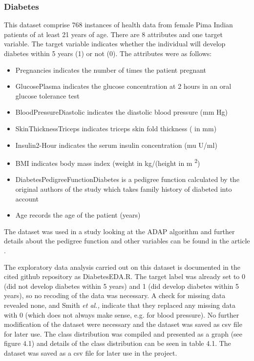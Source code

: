 \subsubsection{Diabetes}
This dataset comprise 768 instances of health data from female Pima Indian patients of at least 21 years of age. There are 8 attributes and one target variable. The target variable indicates whether the individual will develop diabetes within 5 years (1) or not (0). The attributes were as follows:
\begin{itemize}
    \item Pregnancies indicates the number of times the patient pregnant
    \item GlucosePlasma indicates the glucose concentration at 2 hours in an oral glucose tolerance test
    \item BloodPressureDiastolic indicates the diastolic blood pressure (mm Hg)
    \item SkinThicknessTriceps indicates triceps skin fold thickness ( in mm)
    \item Insulin2-Hour indicates the serum insulin concentration  (mu U/ml)
    \item BMI indicates body mass index (weight in kg/(height in m \textsuperscript{2})
    \item DiabetesPedigreeFunctionDiabetes is a pedigree function calculated by the original authors of the study which takes family history of diabeted into account
    \item Age records the age of the patient (years)
\end{itemize}
 The dataset was used in a study looking at the ADAP algorithm and further details about the pedigree function and other variables can be found in the article \cite{Smith:1988wy}.
 
The exploratory data analysis carried out on this dataset is documented in the cited github repository as DiabetesEDA.R.\newline
The target label was already set to 0 (did not develop diabetes within 5 years) and 1 (did develop diabetes within 5 years), so no recoding of the data was necessary.\newline
A check for missing data revealed none, and Smith \textit{et al.,} indicate that they replaced any missing data with 0 (which does not always make sense, e.g. for blood pressure). No further modification of the dataset were necessary and the dataset was saved as csv file for later use.
The class distribution was compiled and presented as a graph (see figure 4.1) and details of the class distribution can be seen in table 4.1. The dataset was saved as a csv file for later use in the project.

